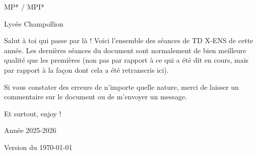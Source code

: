 \documentclass{../commun/prepacours}
\begin{document}
\begin{center}
  \vspace*{2cm}
  
  
  \vspace{1.5cm}
  {\Large MP* / MPI* \par}
  \vspace{0.5cm}
  {\large Lycée Champollion \par}
  \vspace{2cm}
  
  \begin{minipage}{0.8\textwidth}
    \vspace{0.5cm}
    
    \quad Salut à toi qui passe par là ! Voici l'ensemble des séances de TD X-ENS de cette année. 
    Les dernières séances du document sont normalement de bien meilleure qualité que les premières 
    (non pas par rapport à ce qui a été dit en cours, mais par rapport à la façon dont cela a été retranscris 
    ici). 

    \svspace \quad Si vous constater des erreurs de n'importe quelle nature, merci de laisser un commentaire sur le document 
    ou de m'envoyer un message. 

    \avspace 
    \begin{center}
      Et surtout, enjoy !
    \end{center}
    
    \vspace{0.5cm}
  \end{minipage}
  
  \vfill
  {\Large Année 2025-2026 \par}
  \vspace{0.5cm}
  {\normalsize Version du \today \par}
  \vspace{1cm}
\end{center}
\clearpage
\end{document}
